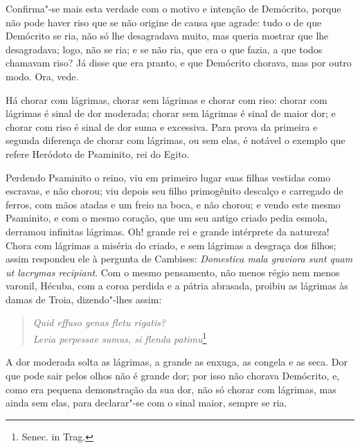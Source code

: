 Confirma"-se mais esta verdade com o motivo e intenção de Demócrito,
porque não pode haver riso que se não origine de causa que agrade: tudo
o de que Demócrito se ria, não só lhe desagradava muito, mas queria
mostrar que lhe desagradava; logo, não se ria; e se não ria, que era o
que fazia, a que todos chamavam riso? Já disse que era pranto, e que
Demócrito chorava, mas por outro modo. Ora, vede.

Há chorar com lágrimas, chorar sem lágrimas e chorar com riso: chorar
com lágrimas é sinal de dor moderada; chorar sem lágrimas é sinal de
maior dor; e chorar com riso é sinal de dor suma e excessiva. Para prova
da primeira e segunda diferença de chorar com lágrimas, ou sem elas, é
notável o exemplo que refere Heródoto de Psaminito, rei do Egito.

Perdendo Psaminito o reino, viu em primeiro lugar suas filhas vestidas
como escravas, e não chorou; viu depois seu filho primogênito descalço e
carregado de ferros, com mãos atadas e um freio na boca, e não chorou; e
vendo este mesmo Psaminito, e com o mesmo coração, que um seu antigo
criado pedia esmola, derramou infinitas lágrimas. Oh! grande rei e
grande intérprete da natureza! Chora com lágrimas a miséria do criado, e
sem lágrimas a desgraça dos filhos; assim respondeu ele à
pergunta de Cambises: \emph{Domestica mala graviora sunt quam ut
lacrymas recipiant}.
Com o mesmo pensamento, não menos régio nem menos varonil, Hécuba, com
a coroa perdida e a pátria abrasada, proibiu as lágrimas às damas de
Troia, dizendo"-lhes assim:

\begin{verse}
\emph{Quid effuso genas fletu rigatis?}\\
\emph{Levia perpessae sumus, si flenda patimu}\footnote{Senec. in Trag.}
\end{verse}

A dor moderada solta as lágrimas, a grande as enxuga, as congela e as
seca. Dor que pode sair pelos olhos não é grande dor; por isso não
chorava Demócrito, e, como era pequena demonstração da sua dor, não só
chorar com lágrimas, mas ainda sem elas, para declarar"-se com o sinal
maior, sempre se ria.

